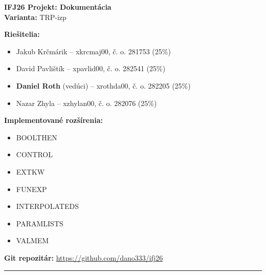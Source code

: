 \documentclass[11pt,a4paper]{article}
\begin{document}
\begin{center}
    {\LARGE \textbf{IFJ26 Projekt: Dokumentácia}} \\[0.5em]
    {\large \textbf{Varianta:} TRP-izp}
\end{center}

\vspace{1em}

\noindent\textbf{Riešitelia:}
\begin{itemize}
    \item Jakub Krčmárik -- xkrcmaj00, č. o. 281753 (25\%)
    \item David Pavlištík -- xpavlid00, č. o. 282541 (25\%)
    \item \textbf{Daniel Roth} (vedúci) -- xrothda00, č. o. 282205 (25\%)
    \item Nazar Zhyla -- xzhylan00, č. o. 282076 (25\%)
\end{itemize}

\noindent\textbf{Implementované rozšírenia:}
\begin{itemize}
	\item BOOLTHEN
	\item CONTROL
	\item EXTKW
	\item FUNEXP
	\item INTERPOLATEDS
	\item PARAMLISTS
	\item VALMEM
\end{itemize}
\noindent\textbf{Git repozitár:} \url{https://github.com/dano333/ifj26}

\vspace{1.5em}
\hrule
\vspace{1.5em}









\end{document}
